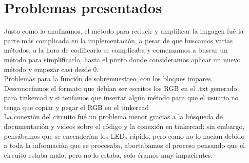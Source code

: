 \documentclass{article}
\begin{document}
\section{Problemas presentados}
Justo como lo analizamos, el método para reducir y amplificar la imgagen fué la parte más complicada en la implementación, a pesar de que buscamos varias métodos, a la hora de codificarlo se complicaba y comenzamos a buscar un método para simplificarlo, hasta el punto donde consideramos aplicar un nuevo método y empezar casi desde 0.\\

Problemas para la función de sobremuestreo, con los bloques impares.\\

Desconocíamos el formato que debían ser escritos los RGB en el .txt generado para tinkercad y si teníamos que insertar algún método para que el usuario no tenga que copiar y pegar el RGB en el tinkercad\\

La conexión del circuito fué un problema menor gracias a la búsqueda de documentación y videos sobre el código y la conexión en tinkercad; sin embargo, pensábamos que se encenderían los LEDs rápido, pero como no lo hacian debido a toda la información que se procesaba, abortabamos el proceso pensando que el circuito estaba malo, pero no lo estaba, solo éramos muy impacientes. 
\end{document}
